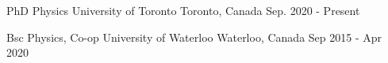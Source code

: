 

\begin{cventries}

  \cventry
    {PhD Physics} %
    {University of Toronto} %
    {Toronto, Canada} %
    {Sep. 2020 - Present} %
    {}

  \cventry
    {Bsc Physics, Co-op} %
    {University of Waterloo} %
    {Waterloo, Canada} %
    {Sep 2015 - Apr 2020} %
    {}
\end{cventries}
